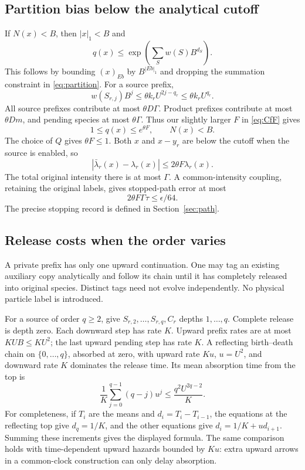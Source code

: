 \documentclass[11pt,reqno]{amsart}
\theoremstyle{definition}
\theoremstyle{remark}
\begin{document}
\subsection{Partition bias below the analytical cutoff}
If $N(x)<B$, then $|x|_1<B$ and
\begin{equation}\label{eq:partition-exp}
 q(x)\le\exp\left(\sum_S w(S)B^{d_S}\right).
\end{equation}
This follows by bounding $(x)_{Eb}$ by $B^{|Eb|_1}$ and dropping the summation
constraint in \eqref{eq:partition}. For a source prefix,
\[
 w(S_{r,j})B^j\le\theta k_r U^{2j-q_r}
                    \le\theta k_r U^{q_r}.
\]
All source prefixes contribute at most $\theta D\Gamma$. Product prefixes
contribute at most $\theta Dm$, and pending species at most $\theta\Gamma$.
Thus our slightly larger $F$ in \eqref{eq:CfF} gives
\begin{equation}\label{eq:q-bound}
 1\le q(x)\le e^{\theta F},\qquad N(x)<B.
\end{equation}
The choice of $Q$ gives $\theta F\le1$. Both $x$ and $x-y_r$ are below the
cutoff when the source is enabled, so
\begin{equation}\label{eq:rate-bias}
 |\bar\lambda_r(x)-\lambda_r(x)|
 \le2\theta F\lambda_r(x).
\end{equation}
The total original intensity there is at most $\Gamma$.
A common-intensity coupling, retaining the original labels, gives stopped-path
error at most
\begin{equation}\label{eq:bias-error}
 2\theta F\Gamma\tau\le\epsilon/64.
\end{equation}
The precise stopping record is defined in Section~\ref{sec:path}.

\subsection{Release costs when the order varies}
A private prefix has only one upward continuation. One may tag an existing
auxiliary copy analytically and follow its chain until it has completely
released into original species. Distinct tags need not evolve independently.
No physical particle label is introduced.

For a source of order $q\ge2$, give $S_{r,2},\ldots,S_{r,q},C_r$ depths
$1,\ldots,q$. Complete release is depth zero. Each downward step has rate
$K$. Upward prefix rates are at most $KUB\le KU^2$; the last upward pending
step has rate $K$. A reflecting birth--death chain on $\{0,\ldots,q\}$,
absorbed at zero, with upward rate $Ku$, $u=U^2$, and downward rate $K$
dominates the release time. Its mean absorption time from the top is
\begin{equation}\label{eq:birth-death-time}
 \frac1K\sum_{j=0}^{q-1}(q-j)u^j
 \le\frac{q^2U^{2q-2}}K.
\end{equation}
For completeness, if $T_i$ are the means and $d_i=T_i-T_{i-1}$, the equations
at the reflecting top give $d_q=1/K$, and the other equations give
$d_i=1/K+u d_{i+1}$. Summing these increments gives the displayed formula.
The same comparison holds with time-dependent upward hazards bounded by $Ku$:
extra upward arrows in a common-clock construction can only delay absorption.
\end{document}
